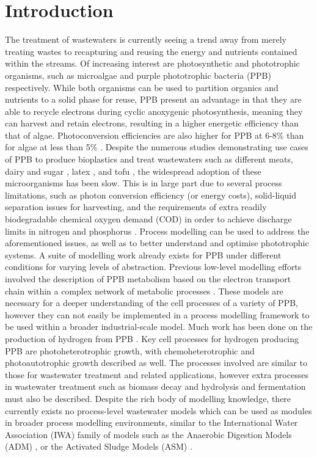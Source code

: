 \section{Introduction}
\label{Sec:chap2_intro}

The treatment of wastewaters is currently seeing a trend away from merely treating wastes to recapturing and reusing the energy and nutrients contained within the streams. Of increasing interest are photosynthetic and phototrophic organisms, such as microalgae \cite{ward2014} and purple phototrophic bacteria (PPB) \cite{hulsen2014} respectively. While both organisms can be used to partition organics and nutrients to a solid phase for reuse, PPB present an advantage in that they are able to recycle electrons during cyclic anoxygenic photosynthesis, meaning they can harvest and retain electrons, resulting in a higher energetic efficiency than that of algae. Photoconversion efficiencies are also higher for PPB at 6-8\% \cite{miyake1987} than for algae at less than 5\% \cite{posten2009}. Despite the numerous studies demonstrating use cases of PPB to produce bioplastics \cite{melnicki2009} and treat wastewaters such as different meats, dairy and sugar \cite{hulsen2018}, latex \cite{kantachote2005}, and tofu \cite{zhu1999}, the widespread adoption of these microorganisms has been slow. This is in large part due to several process limitations, such as photon conversion efficiency (or energy costs), solid-liquid separation issues for harvesting, and the requirements of extra readily biodegradable chemical oxygen demand (COD) in order to achieve discharge limits in nitrogen and phosphorus \cite{hulsen2015}.
\skippingparagraph
Process modelling can be used to address the aforementioned issues, as well as to better understand and optimise phototrophic systems. A suite of modelling work already exists for PPB under different conditions for varying levels of abstraction. Previous low-level modelling efforts involved the description of PPB metabolism based on the electron transport chain within a complex network of metabolic processes \cite{golomysova2010}. These models are necessary for a deeper understanding of the cell processes of a variety of PPB, however they can not easily be implemented in a process modelling framework to be used within a broader industrial-scale model. Much work has been done on the production of hydrogen from PPB \cite{eroglu2008}. Key cell processes for hydrogen producing PPB are photoheterotrophic growth, with chemoheterotrophic and photoautotrophic growth described as well. The processes involved are similar to those for wastewater treatment and related applications, however extra processes in wastewater treatment such as biomass decay and hydrolysis and fermentation must also be described. Despite the rich body of modelling knowledge, there currently exists no process-level wastewater models which can be used as modules in broader process modelling environments, similar to the International Water Association (IWA) family of models \cite{henze1987} such as the Anaerobic Digestion Models (ADM) \cite{batstone2002}, or the Activated Sludge Models (ASM) \cite{gujer1999}. 
